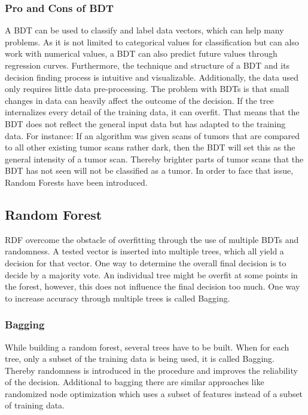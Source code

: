 \documentclass[
12pt,
headsepline,
bibliography=totoc,
twoside=semi,
fleqn
]{scrartcl}
\begin{document}
 \subsubsection{Pro and Cons of BDT\label{sec:sec2-1-5}}
 A BDT can be used to classify and label data vectors, which can help many problems. As it is not limited to categorical values for classification but can also work with numerical values, a BDT can also predict future values through regression curves. Furthermore, the technique and structure of a BDT and its decision finding process is intuitive and visualizable. Additionally, the data used only requires little data pre-processing. The problem with BDTs is that small changes in data can heavily affect the outcome of the decision. If the tree internalizes every detail of the training data, it can overfit. That means that the BDT does not reflect the general input data but has adapted to the training data. For instance: If an algorithm was given scans of tumors that are compared to all other existing tumor scans rather dark, then the BDT will set this as the general intensity of a tumor scan. Thereby brighter parts of tumor scans that the BDT has not seen will not be classified as a tumor. In order to face that issue, Random Forests have been introduced. 

 \subsection{Random Forest\label{sec:sec2-2}}
   RDF overcome the obstacle of overfitting through the use of multiple BDTs and randomness. A tested vector is inserted into multiple trees, which all yield a decision for that vector. One way to determine the overall final decision is to decide by a majority vote. An individual tree might be overfit at some points in the forest, however, this does not influence the final decision too much. One way to increase accuracy through multiple trees is called Bagging.

 \subsubsection{Bagging\label{sec:sec2-2-1}}
 While building a random forest, several trees have to be built. When for each tree, only a subset of the training data is being used, it is called Bagging. Thereby randomness is introduced in the procedure and improves the reliability of the decision. Additional to bagging there are similar approaches like randomized node optimization which uses a subset of features instead of a subset of training data.  
 
\end{document}
